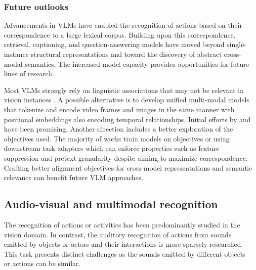

\subsubsection{Future outlooks}

Advancements in VLMs have enabled the recognition of actions based on their correspondence to a large lexical corpus. Building upon this correspondence, retrieval, captioning, and question-answering models have moved beyond single-instance structural representations and toward the discovery of abstract cross-modal semantics. The increased model capacity provides opportunities for future lines of research.

Most VLMs strongly rely on linguistic associations that may not be relevant in vision instances \citep{rahmanzadehgervi2024vision}. A possible alternative is to develop unified multi-modal models that tokenize and encode video frames and images in the same manner with positional embeddings also encoding temporal relationships. Initial efforts by \citet{jang2023unifying} and \citet{jin2024integration} have been promising. Another direction includes a better exploration of the objectives used. The majority of works train models on objectives \citep{chen2020simple,he2020momentum,oord2018representation} or using downstream task adapters \citep{hu2021lora} which can enforce properties such as feature suppression \citep{chen2021intriguing} and pretext granularity \citep{cole2022does} despite aiming to maximize correspondence. Crafting better alignment objectives for cross-model representations and semantic relevance can benefit future VLM approaches.  




\subsection{Audio-visual and multimodal recognition} 
\label{sec:recognition::audio}

The recognition of actions or activities has been predominantly studied in the vision domain. In contrast, the auditory recognition of actions from sounds emitted by objects or actors and their interactions is more sparsely researched. This task presents distinct challenges as the sounds emitted by different objects or actions can be similar. 

